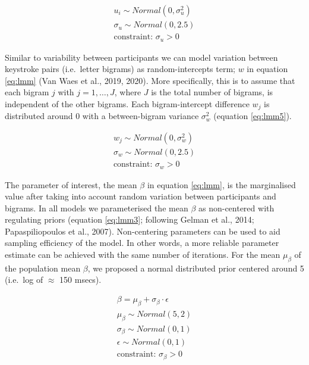 \documentclass[
  english,
  man,mask,floatsintext]{apa7}
\begin{document}
\begin{equation}
\begin{aligned}
\label{eq:lmm2}
u_i \sim Normal(0,\sigma_u^2)\\
\sigma_u \sim Normal(0,2.5)\\
\text{constraint: } \sigma_u >0 
\end{aligned}
\end{equation}

Similar to variability between participants we can model variation between keystroke pairs (i.e.~letter bigrams) as random-intercepts term; \(w\) in equation \ref{eq:lmm} (Van Waes et al., 2019, 2020). More specifically, this is to assume that each bigram \(j\) with \(j = 1, \dots, J\), where \(J\) is the total number of bigrams, is independent of the other bigrams. Each bigram-intercept difference \(w_j\) is distributed around 0 with a between-bigram variance \(\sigma_w^2\) (equation \ref{eq:lmm5}).

\begin{equation}
\begin{aligned}
\label{eq:lmm5}
w_j \sim Normal(0,\sigma_w^2)\\
\sigma_w \sim Normal(0,2.5)\\
\text{constraint: }\sigma_w >0 
\end{aligned}
\end{equation}

The parameter of interest, the mean \(\beta\) in equation \ref{eq:lmm}, is the marginalised value after taking into account random variation between participants and bigrams. In all models we parameterised the mean \(\beta\) as non-centered with regulating priors (equation \ref{eq:lmm3}; following Gelman et al., 2014; Papaspiliopoulos et al., 2007). Non-centering parameters can be used to aid sampling efficiency of the model. In other words, a more reliable parameter estimate can be achieved with the same number of iterations. For the mean \(\mu_\beta\) of the population mean \(\beta\), we proposed a normal distributed prior centered around 5 (i.e.~log of \(\approx\) 150 msecs).

\begin{equation}
\begin{aligned}
\label{eq:lmm3}
\beta = \mu_{\beta} + \sigma_{\beta} \cdot \epsilon\\
\mu_{\beta} \sim Normal(5,2)\\
\sigma_{\beta} \sim Normal(0,1)\\
\epsilon \sim Normal(0,1)\\
\text{constraint: }\sigma_{\beta}>0 
\end{aligned}
\end{equation}
\end{document}
